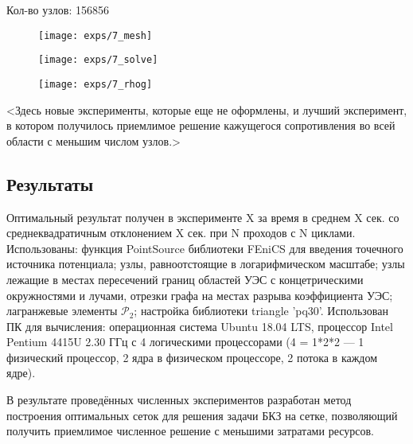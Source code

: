 Кол-во узлов: 156856

\begin{figure}[H]
  \texttt{[image: exps/7\_mesh]}
\end{figure}
\begin{figure}[H]
  \texttt{[image: exps/7\_solve]}
\end{figure}
\begin{figure}[H]
  \texttt{[image: exps/7\_rhog]}
\end{figure}

<Здесь новые эксперименты, которые еще не оформлены,
и лучший эксперимент, в котором получилось приемлимое решение кажущегося сопротивления во всей области
с меньшим числом узлов.>

\subsection{Результаты}

Оптимальный результат получен в эксперименте X за время в среднем X сек.
со среднеквадратичным отклонением X сек. при N проходов с N циклами. Использованы:
функция PointSource библиотеки FEniCS для введения точечного источника потенциала; узлы, равноотстоящие в логарифмическом масштабе;
узлы лежащие в местах пересечений границ областей УЭС с концетрическими окружностями и лучами,
отрезки графа на местах разрыва коэффициента УЭС; лагранжевые элементы $\mathcal{P}_2$; настройка библиотеки triangle 'pq30'.
Использован ПК для вычисления: операционная система Ubuntu 18.04 LTS, процессор Intel Pentium 4415U 2.30 ГГц с 4 логическими процессорами
(4 = 1*2*2 --- 1 физический процессор, 2 ядра в физическом процессоре, 2 потока в каждом ядре).

В результате проведённых численных экспериментов разработан метод построения оптимальных сеток
для решения задачи БКЗ на сетке, позволяющий получить приемлимое численное решение с меньшими затратами ресурсов.

\clearpage
